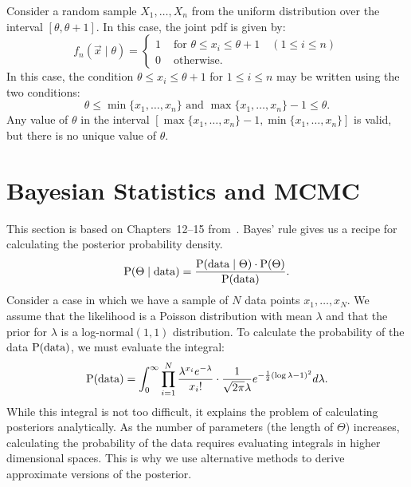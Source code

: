 \begin{example}
Consider a random sample $X_1, \ldots, X_n$ from the uniform distribution 
over the interval $[\theta, \theta + 1]$. In this case, the joint pdf 
is given by:
\[
    f_n(\vec{x} \mid \theta) 
        = \left \{ 
            \begin{array}{ll}
                1  & \text{ for } \theta \leq x_i \leq \theta + 1 \quad (1 \leq i \leq n)\\
                0  & \text{ otherwise}. 
            \end{array}
          \right . 
\]
In this case, the condition $\theta \leq x_i \leq \theta + 1$ for $1 \leq i \leq n$
may be written using the two conditions:
\[
    \theta \leq \min \{x_1, \ldots, x_n\} \text{ and } 
    \max \{x_1, \ldots, x_n \} - 1 \leq \theta.
\]
Any value of $\theta$ in the interval $[\max \{x_1, \ldots, x_n \} - 1, 
\min \{x_1, \ldots, x_n\}]$ is valid, but there is no unique value of $\theta$.
\eop
\end{example}

\section{Bayesian Statistics and MCMC}
This section is based on Chapters~12--15 from~\cite{Lam}. Bayes' rule gives us a
 recipe for calculating the posterior probability density. 
\begin{equation}
	\operatorname{P} (\Theta \mid \text{data}) = 
	\frac{\operatorname{P} (\text{data} \mid \Theta) \cdot \operatorname{P} (\Theta)}{\operatorname{P} (\text{data})}.
\end{equation}
Consider a case in which we have a sample of $N$ data points $x_1, \ldots, x_N$. 
We assume that the likelihood is a Poisson distribution with mean $\lambda$ and 
that the prior for $\lambda$ is a log-normal$(1, 1)$ distribution. To calculate 
the probability of the data $\operatorname{P} (\text{data})$, we must evaluate the integral:
\begin{equation}
	\operatorname{P} (\text{data}) = \int_{0}^{\infty} 
		\prod_{i = 1}^N \frac{\lambda^{x_i} e^{- \lambda}}{x_i!} \cdot 
		\frac{1}{\sqrt{2 \pi} \lambda} e^{- \frac{1}{2} (\log \lambda - 1)^2} 
		d\lambda.
\end{equation}
While this integral is not too difficult, it explains the problem of calculating 
posteriors analytically. As the number of parameters (the length of $\Theta$) 
increases, calculating the probability of the data requires evaluating integrals 
in higher dimensional spaces. This is why we use alternative methods to derive 
approximate versions of the posterior.

